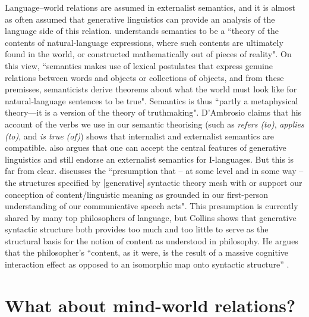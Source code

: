 Language--world relations are assumed in externalist semantics, and it is almost as often assumed that generative linguistics can provide an analysis of the language side of this relation. \citet[214]{DAmbrosio2019} understands semantics to be a “theory of the contents of natural-language expressions, where such contents are ultimately found in the world, or constructed mathematically out of pieces of reality". On this view, “semantics makes use of lexical postulates that express genuine relations between words and objects or collections of objects, and from these premisses, semanticists derive theorems about what the world must look like for natural-language sentences to be true". Semantics is thus “partly a metaphysical theory—it is a version of the theory of truthmaking". D'Ambrosio claims that his account of the verbs we use in our semantic theorising (such as \textit{refers (to)}, \textit{applies (to)}, and \textit{is true (of)}) shows that internalist and externalist semantics are compatible. \citet{King2007,King2018} also argues that one can accept the central features of generative linguistics and still endorse an externalist semantics for I-languages. But this is far from clear. \citet[805]{Collins2007} discusses the “presumption that -- at some level and in some way -- the structures specified by [generative] syntactic theory mesh with or support our conception of content/linguistic meaning as grounded in our first-person understanding of our communicative speech acts". This presumption is currently shared by many top philosophers of language, but Collins shows that generative syntactic structure both provides too much and too little to serve as the structural basis for the notion of content as understood in philosophy. He argues that the philosopher’s “content, as it were, is the result of a massive cognitive interaction effect as opposed to an isomorphic map onto syntactic structure” \citep[806]{Collins2007}.

\section{What about mind-world relations?}

